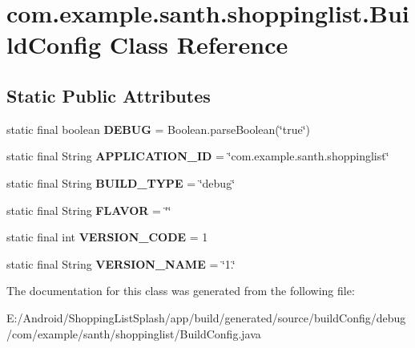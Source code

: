 \hypertarget{classcom_1_1example_1_1santh_1_1shoppinglist_1_1_build_config}{}\section{com.\+example.\+santh.\+shoppinglist.\+Build\+Config Class Reference}
\label{classcom_1_1example_1_1santh_1_1shoppinglist_1_1_build_config}
\subsection*{Static Public Attributes}
\begin{DoxyCompactItemize}
\item 
static final boolean {\bfseries D\+E\+B\+UG} = Boolean.\+parse\+Boolean(\char`\"{}true\char`\"{})\hypertarget{classcom_1_1example_1_1santh_1_1shoppinglist_1_1_build_config_a370fc5c9f3a725f06cd2f210f49e66e0}{}\label{classcom_1_1example_1_1santh_1_1shoppinglist_1_1_build_config_a370fc5c9f3a725f06cd2f210f49e66e0}

\item 
static final String {\bfseries A\+P\+P\+L\+I\+C\+A\+T\+I\+O\+N\+\_\+\+ID} = \char`\"{}com.\+example.\+santh.\+shoppinglist\char`\"{}\hypertarget{classcom_1_1example_1_1santh_1_1shoppinglist_1_1_build_config_a1de2fd93f571ce3cbd89a32ba33646ac}{}\label{classcom_1_1example_1_1santh_1_1shoppinglist_1_1_build_config_a1de2fd93f571ce3cbd89a32ba33646ac}

\item 
static final String {\bfseries B\+U\+I\+L\+D\+\_\+\+T\+Y\+PE} = \char`\"{}debug\char`\"{}\hypertarget{classcom_1_1example_1_1santh_1_1shoppinglist_1_1_build_config_af60167070967ea5a8108a15d119de9d3}{}\label{classcom_1_1example_1_1santh_1_1shoppinglist_1_1_build_config_af60167070967ea5a8108a15d119de9d3}

\item 
static final String {\bfseries F\+L\+A\+V\+OR} = \char`\"{}\char`\"{}\hypertarget{classcom_1_1example_1_1santh_1_1shoppinglist_1_1_build_config_a1d249d0b904549d06e3e0aed02583984}{}\label{classcom_1_1example_1_1santh_1_1shoppinglist_1_1_build_config_a1d249d0b904549d06e3e0aed02583984}

\item 
static final int {\bfseries V\+E\+R\+S\+I\+O\+N\+\_\+\+C\+O\+DE} = 1\hypertarget{classcom_1_1example_1_1santh_1_1shoppinglist_1_1_build_config_ab78691134ea4e7d11b6ad679ffe2ae57}{}\label{classcom_1_1example_1_1santh_1_1shoppinglist_1_1_build_config_ab78691134ea4e7d11b6ad679ffe2ae57}

\item 
static final String {\bfseries V\+E\+R\+S\+I\+O\+N\+\_\+\+N\+A\+ME} = \char`\"{}1.\char`\"{}\hypertarget{classcom_1_1example_1_1santh_1_1shoppinglist_1_1_build_config_a6509100e90401b570c9d6f4143bc3886}{}\label{classcom_1_1example_1_1santh_1_1shoppinglist_1_1_build_config_a6509100e90401b570c9d6f4143bc3886}

\end{DoxyCompactItemize}


The documentation for this class was generated from the following file\+:\begin{DoxyCompactItemize}
\item 
E\+:/\+Android/\+Shopping\+List\+Splash/app/build/generated/source/build\+Config/debug/com/example/santh/shoppinglist/Build\+Config.\+java\end{DoxyCompactItemize}
